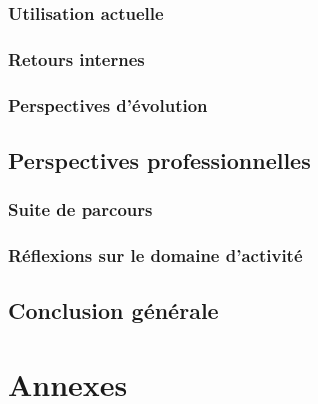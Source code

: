 \documentclass[12pt]{article}
\begin{document}
\subsubsection{Utilisation actuelle}
\subsubsection{Retours internes}
\subsubsection{Perspectives d’évolution}

\subsection{Perspectives professionnelles}
\subsubsection{Suite de parcours}
\subsubsection{Réflexions sur le domaine d’activité}

\subsection{Conclusion générale}

\section{Annexes}
\end{document}
